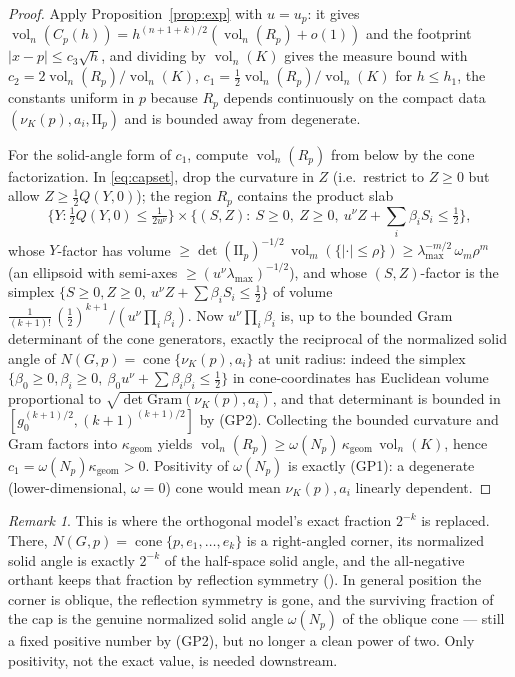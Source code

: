 \documentclass[11pt]{article}
\theoremstyle{definition}
\theoremstyle{remark}
\newtheorem{remark}[theorem]{Remark}
\newcommand{\vol}{\operatorname{vol}}
\newcommand{\cone}{\operatorname{cone}}
\newcommand{\nor}{\nu_K}
\begin{document}
\begin{proof}
Apply Proposition~\ref{prop:exp} with $u=u_p$: it gives
$\vol_n(C_p(h))=h^{(n+1+k)/2}(\vol_n(R_p)+o(1))$ and the footprint
$|x-p|\le c_3\sqrt h$, and dividing by $\vol_n(K)$ gives the measure bound with
$c_2=2\vol_n(R_p)/\vol_n(K)$, $c_1=\tfrac12\vol_n(R_p)/\vol_n(K)$ for
$h\le h_1$, the constants uniform in $p$ because $R_p$ depends continuously on
the compact data $(\nor(p),a_i,\mathrm{I\!I}_p)$ and is bounded away from
degenerate.

For the solid-angle form of $c_1$, compute $\vol_n(R_p)$ from below by the
cone factorization.  In \eqref{eq:capset}, drop the curvature in $Z$
(i.e.\ restrict to $Z\ge0$ but allow $Z\ge\tfrac12Q(Y,0)$); the region $R_p$
contains the product slab
\[
\{Y:\tfrac12 Q(Y,0)\le\tfrac1{2u^\nu}\}\times
\{(S,Z):\ S\ge0,\ Z\ge0,\ u^\nu Z+\textstyle\sum_i\beta_i S_i\le\tfrac12\},
\]
whose $Y$-factor has volume
$\ge\det(\mathrm{I\!I}_p)^{-1/2}\,\vol_m(\{|\cdot|\le\rho\})\ge
\lambda_{\max}^{-m/2}\,\omega_m\rho^m$ (an ellipsoid with semi-axes
$\ge(u^\nu\lambda_{\max})^{-1/2}$), and whose $(S,Z)$-factor is the simplex
$\{S\ge0,Z\ge0,\ u^\nu Z+\sum\beta_iS_i\le\tfrac12\}$ of volume
$\tfrac1{(k+1)!}\,(\tfrac12)^{k+1}/(u^\nu\prod_i\beta_i)$.  Now
$u^\nu\prod_i\beta_i$ is, up to the bounded Gram determinant of the cone
generators, exactly the reciprocal of the normalized solid angle of
$N(G,p)=\cone\{\nor(p),a_i\}$ at unit radius: indeed the simplex
$\{\beta_0\ge0,\beta_i\ge0,\ \beta_0u^\nu+\sum\beta_i\beta_i\le\tfrac12\}$ in
cone-coordinates has Euclidean volume proportional to
$\sqrt{\det \mathrm{Gram}(\nor(p),a_i)}$, and that determinant is bounded in
$[g_0^{(k+1)/2}, (k+1)^{(k+1)/2}]$ by (GP2).  Collecting the bounded curvature
and Gram factors into $\kappa_{\mathrm{geom}}$ yields
$\vol_n(R_p)\ge\omega(N_p)\,\kappa_{\mathrm{geom}}\,\vol_n(K)$, hence
$c_1=\omega(N_p)\kappa_{\mathrm{geom}}>0$.  Positivity of $\omega(N_p)$ is
exactly (GP1): a degenerate (lower-dimensional, $\omega=0$) cone would mean
$\nor(p),a_i$ linearly dependent.
\end{proof}

\begin{remark}\label{rem:reflfrac}
This is where the orthogonal model's exact fraction $2^{-k}$ is replaced.
There, $N(G,p)=\cone\{p,e_1,\dots,e_k\}$ is a right-angled corner, its
normalized solid angle is exactly $2^{-k}$ of the half-space solid angle, and
the all-negative orthant keeps that fraction by reflection symmetry
(\cite[Lemma 2.2]{companion11}).  In general position the corner is oblique,
the reflection symmetry is gone, and the surviving fraction of the cap is the
genuine normalized solid angle $\omega(N_p)$ of the oblique cone --- still a
fixed positive number by (GP2), but no longer a clean power of two.  Only
positivity, not the exact value, is needed downstream.
\end{remark}
\end{document}
